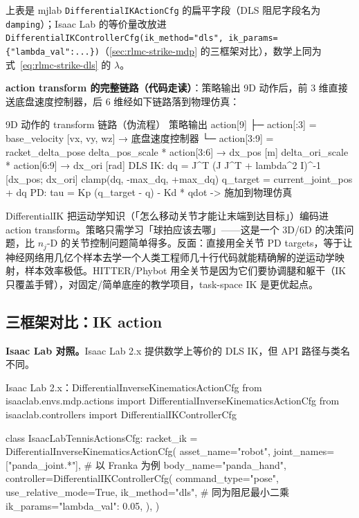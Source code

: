 \noindent{}上表是 mjlab \verb|DifferentialIKActionCfg| 的扁平字段（DLS 阻尼字段名为 \verb|damping|）；Isaac Lab 的等价量改放进 \verb|DifferentialIKControllerCfg(ik_method="dls", ik_params={"lambda_val":...})|（\cref{sec:rlmc-strike-mdp} 的三框架对比），数学上同为式~\eqref{eq:rlmc-strike-dls} 的 $\lambda$。

\textbf{action transform 的完整链路（代码走读）}：策略输出 9D 动作后，前 3 维直接送底盘速度控制器，后 6 维经如下链路落到物理仿真：
\begin{codebox}[text]{9D 动作的 transform 链路（伪流程）}
策略输出 action[9]
  ├─ action[:3] = base_velocity [vx, vy, wz]  → 底盘速度控制器
  └─ action[3:9] = racket_delta_pose
       delta_pos_scale * action[3:6] → dx_pos [m]
       delta_ori_scale * action[6:9] → dx_ori [rad]
       DLS IK: dq = J^T (J J^T + lambda^2 I)^{-1} [dx_pos; dx_ori]
       clamp(dq, -max_dq, +max_dq)
       q_target = current_joint_pos + dq
       PD: tau = Kp (q_target - q) - Kd * qdot   -> 施加到物理仿真
\end{codebox}

\begin{insight}\label{ins:rlmc-strike-taskspace}
DifferentialIK 把运动学知识（「怎么移动关节才能让末端到达目标」）编码进 action transform。策略只需学习「球拍应该去哪」——这是一个 3D/6D 的决策问题，比 $n_j$-D 的关节控制问题简单得多。反面：直接用全关节 PD targets，等于让神经网络用几亿个样本去学一个人类工程师几十行代码就能精确解的逆运动学映射，样本效率极低。HITTER/Phybot 用全关节是因为它们要协调腿和躯干（IK 只覆盖手臂），对固定/简单底座的教学项目，task-space IK 是更优起点。
\end{insight}

\subsection{三框架对比：IK action}

\textbf{Isaac Lab 对照。}Isaac Lab 2.x 提供数学上等价的 DLS IK，但 API 路径与类名不同。

\begin{codebox}[Python]{Isaac Lab 2.x：DifferentialInverseKinematicsActionCfg}
from isaaclab.envs.mdp.actions import DifferentialInverseKinematicsActionCfg
from isaaclab.controllers import DifferentialIKControllerCfg

class IsaacLabTennisActionsCfg:
    racket_ik = DifferentialInverseKinematicsActionCfg(
        asset_name="robot",
        joint_names=["panda_joint.*"],         # 以 Franka 为例
        body_name="panda_hand",
        controller=DifferentialIKControllerCfg(
            command_type="pose",
            use_relative_mode=True,
            ik_method="dls",                    # 同为阻尼最小二乘
            ik_params={"lambda_val": 0.05},
        ),
    )
\end{codebox}

